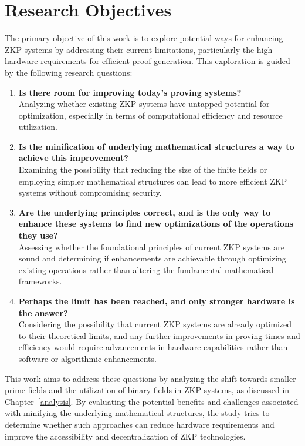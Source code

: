 \chapter{Research Objectives}

The primary objective of this work is to explore potential ways for
enhancing ZKP systems by addressing their current limitations, particularly
the high hardware requirements for efficient proof generation. This
exploration is guided by the following research questions:

\begin{enumerate}
	\item \textbf{Is there room for improving today's proving systems?}\\
		Analyzing whether existing ZKP systems have untapped potential
		for optimization, especially in terms of computational efficiency and
		resource utilization.

	\item \textbf{Is the minification of underlying mathematical structures a
	way to achieve this improvement?}\\ Examining the possibility that
	reducing the size of the finite fields or employing simpler mathematical
	structures can lead to more efficient ZKP systems without compromising security.

	\item \textbf{Are the underlying principles correct, and is the only way
	to enhance these systems to find new optimizations of the operations they
	use?}\\ Assessing whether the foundational principles of current ZKP
	systems are sound and determining if enhancements are achievable through
	optimizing existing operations rather than altering the fundamental
	mathematical frameworks.

	\item \textbf{Perhaps the limit has been reached, and only stronger
	hardware is the answer?}\\ Considering the possibility that current ZKP
	systems are already optimized to their theoretical limits, and any further
	improvements in proving times and efficiency would require advancements in
	hardware capabilities rather than software or algorithmic enhancements.
\end{enumerate}

This work aims to address these questions by analyzing the shift towards
smaller prime fields and the utilization of binary fields in ZKP systems, as
discussed in Chapter~\ref{analysis}. By evaluating the potential
benefits and challenges associated with minifying the underlying mathematical
structures, the study tries to determine whether such approaches can
reduce hardware requirements and improve the accessibility and
decentralization of ZKP technologies.
